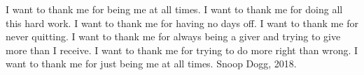 \documentclass{subfiles}
\begin{document}
\begin{preface}
    I want to thank me for being me at all times. I want to thank me for doing all this hard work. I want to thank me for having no days off. I want to thank me for never quitting. I want to thank me for always being a giver and trying to give more than I receive. I want to thank me for trying to do more right than wrong. I want to thank me for just being me at all times. Snoop Dogg, 2018.
\end{preface}
\end{document}
